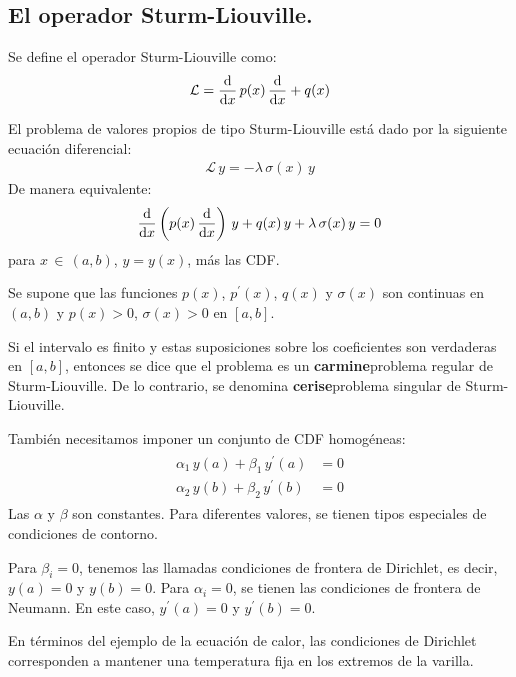 \documentclass[12pt]{article}
\newcommand{\pderivada}[1]{\ensuremath{{#1}^{\prime}}}
\numberwithin{equation}{section}
\begin{document}
\subsection{El operador Sturm-Liouville.}

Se define el operador Sturm-Liouville como:
\begin{align}
\mathcal{L} = \dv{x} \, p(x) \, \dv{x} + q(x)
\label{eq:ecuacion_04_02}
\end{align}

El problema de valores propios de tipo Sturm-Liouville está dado por la siguiente ecuación diferencial:
\begin{align*}
\mathcal{L} \, y = - \lambda \, \sigma(x) \, y
\end{align*}
De manera equivalente:
\begin{align}
\dv{x} \left( p (x) \, \dv{x} \right) \, y + q (x) \, y + \lambda \, \sigma (x) \, y = 0
\label{eq:ecuacion_04_03}
\end{align}
para $x \, \in \, (a, b)$, $y = y (x)$, más las CDF.
\par
Se supone que las funciones $p (x)$, $\pderivada{p} (x)$, $q (x)$ y $\sigma (x)$ son continuas en $(a, b)$ y $p (x) > 0$, $\sigma (x) > 0$ en $[a , b]$.
\par
Si el intervalo es finito y estas suposiciones sobre los coeficientes son verdaderas en $[a, b]$, entonces se dice que el problema es un \textbf{carmine}{problema regular de Sturm-Liouville}. De lo contrario, se denomina \textbf{cerise}{problema singular de Sturm-Liouville}.
\par
También necesitamos imponer un conjunto de CDF homogéneas:
\begin{align}
\begin{aligned}
\alpha_{1} \, y(a) + \beta_{1} \, \pderivada{y} (a) &= 0 \\[0.5em]
\alpha_{2} \, y(b) + \beta_{2} \, \pderivada{y} (b) &= 0
\end{aligned}
\label{eq:ecuacion_04_04}
\end{align}
Las $\alpha$ y $\beta$ son constantes. Para diferentes valores, se tienen tipos especiales de condiciones de contorno.
\par
Para $\beta_{i} = 0$, tenemos las llamadas condiciones de frontera de Dirichlet, es decir, $y (a) = 0$ y $y (b) = 0$. Para $\alpha_{i} = 0$, se tienen las condiciones de frontera de Neumann. En este caso, $\pderivada{y} (a) = 0$ y $\pderivada{y} (b) = 0$.
\par
En términos del ejemplo de la ecuación de calor, las condiciones de Dirichlet corresponden a mantener una temperatura fija en los extremos de la varilla.
\end{document}

